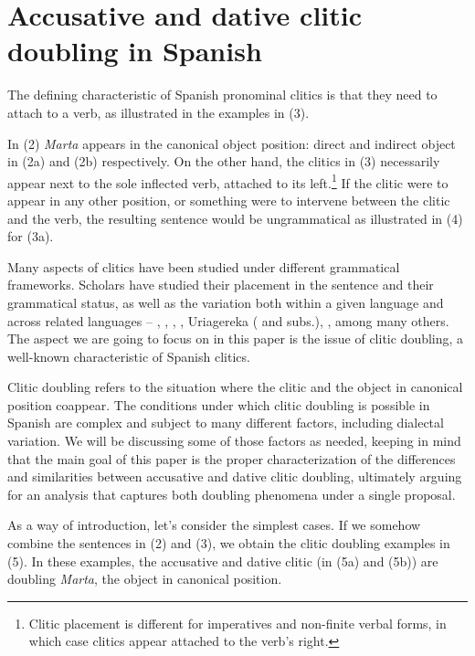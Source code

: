 \documentclass[output=paper,colorlinks,citecolor=brown,
]{langscibook}
\begin{document}
\section{Accusative and dative clitic doubling in Spanish}

The defining characteristic of Spanish pronominal clitics is that they need to attach to a verb, as illustrated in the examples in (3). 




In (2) \textit{Marta} appears in the canonical object position: direct and indirect object in (2a) and (2b) respectively. On the other hand, the clitics in (3) necessarily appear next to the sole inflected verb, attached to its left.\footnote{\textrm{ Clitic placement is different for imperatives and non-finite verbal forms, in which case clitics appear attached to the verb’s right.}} If the clitic were to appear in any other position, or something were to intervene between the clitic and the verb, the resulting sentence would be ungrammatical as illustrated in (4) for (3a).




Many aspects of clitics have been studied under different grammatical frameworks. Scholars have studied their placement in the sentence and their grammatical status, as well as the variation both within a given language and across related languages – \citet{kayne1975}, \citet{strozer1976}, \citet{rivas1977}, \citet{suñer1988}, Uriagereka (\citeyear{uriagereka1988} and subs.), \citet{raposo2005}, among many others. The aspect we are going to focus on in this paper is the issue of clitic doubling, a well-known characteristic of Spanish clitics. 

Clitic doubling refers to the situation where the clitic and the object in canonical position coappear. The conditions under which clitic doubling is possible in Spanish are complex and subject to many different factors, including dialectal variation. We will be discussing some of those factors as needed, keeping in mind that the main goal of this paper is the proper characterization of the differences and similarities between accusative and dative clitic doubling, ultimately arguing for an analysis that captures both doubling phenomena under a single proposal. 

As a way of introduction, let’s consider the simplest cases. If we somehow combine the sentences in (2) and (3), we obtain the clitic doubling examples in (5). In these examples, the accusative and dative clitic (in (5a) and (5b)) are doubling \textit{Marta}, the object in canonical position. 
\end{document}
